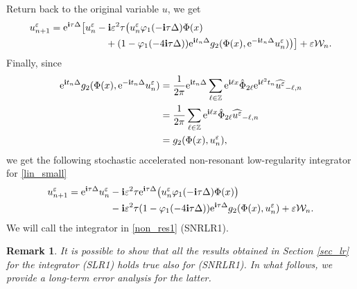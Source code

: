 \documentclass[a4paper]{amsart}
\newtheorem{remark}{Remark}[section]
\begin{document}
Return back to the original variable $u$, we get 
\begin{align*}
u^\varepsilon_{n+1}&={\rm e}^{{\bf i}\tau \Delta}\big[u^\varepsilon_n-{\bf i} \varepsilon^2 \tau \big(u^\varepsilon_n\varphi_1(-{\bf i}\tau \Delta) \Phi(x)\\
&\hspace{2cm}+(1-\varphi_1(-4{\bf i}\tau \Delta)){\rm e}^{{\bf i}t_n \Delta} g_2(\Phi(x),{\rm e}^{-{\bf i}t_n\Delta}u^\varepsilon_n)\big)\big]+\varepsilon \mathcal{W}_n.
\end{align*}
Finally, since
\begin{align*}
    {\rm e}^{{\bf i}t_n \Delta} g_2(\Phi(x),{\rm e}^{-{\bf i}t_n\Delta}u^\varepsilon_n)& = \frac{1}{2\pi}
    {\rm e}^{{\bf i}t_n \Delta} \displaystyle\sum_{\ell\in\mathbb{Z}}{\rm e}^{{\bf i}\ell x}\hat{\Phi}_{2\ell}{\rm e}^{{\bf i}\ell^2 t_n}\widehat{u^\varepsilon}_{-\ell ,n}\\
    &= \frac{1}{2\pi}\displaystyle\sum_{\ell\in\mathbb{Z}}{\rm e}^{{\bf i}\ell x}\hat{\Phi}_{2\ell}\widehat{u^\varepsilon}_{-\ell,n}\\
    &=g_2(\Phi(x),u^\varepsilon_n),
\end{align*}
we get the following stochastic accelerated non-resonant low-regularity integrator for \eqref{lin_small}
\begin{align}
u^\varepsilon_{n+1}={\rm e}^{{\bf i}\tau\Delta} u^\varepsilon_n&-{\bf i}\varepsilon^2 \tau {\rm e}^{{\bf i}\tau \Delta} \big(u^\varepsilon_n\varphi_1(-{\bf i}\tau\Delta)\Phi(x)\big)\notag \\
&-{\bf i}\varepsilon^2 \tau (1-\varphi_1(-4{\bf i}\tau\Delta)){\rm e}^{{\bf i}\tau\Delta}g_2(\Phi(x),u^ \varepsilon_n)+\varepsilon \mathcal{W}_n \label{non_res1}.
\end{align}
We will call the integrator in \eqref{non_res1} (SNRLR1).
\begin{remark}
    It is possible to show that all the results obtained in Section \ref{sec_lr} for the integrator (SLR1) holds true also for (SNRLR1). In what follows, we provide a long-term error analysis for the latter.
\end{remark}
\end{document}
